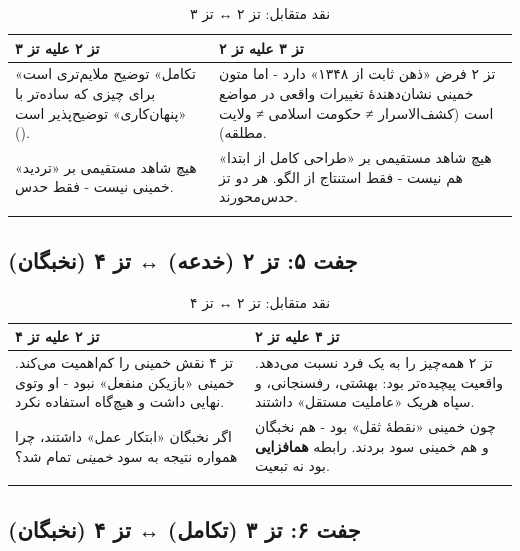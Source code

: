 \documentclass[12pt,a4paper]{book}
\newcommand{\keyword}[1]{\textbf{\textcolor{cPrimary}{#1}}}
\newcommand{\en}[1]{\lr{\textit{#1}}}
\begin{document}
\begin{longtable}{%
    >{\raggedleft\arraybackslash}p{}
    >{\raggedleft\arraybackslash}p{}}
\toprule
\rowcolor{cAccent!8}
\textbf{تز ۲ علیه تز ۳} &
\rowcolor{cGold!10}
\textbf{تز ۳ علیه تز ۲} \\
\midrule

«تکامل» توضیح ملایم‌تری است برای چیزی که ساده‌تر با «پنهان‌کاری» توضیح‌پذیر است (\en{Occam's Razor}). &
تز ۲ فرض «ذهن ثابت از ۱۳۴۸» دارد - اما متون خمینی نشان‌دهندهٔ تغییرات واقعی در مواضع است (کشف‌الاسرار ≠ حکومت اسلامی ≠ ولایت مطلقه). \\
\midrule

هیچ شاهد مستقیمی بر «تردید» خمینی نیست - فقط حدس. &
هیچ شاهد مستقیمی بر «طراحی کامل از ابتدا» هم نیست - فقط استنتاج از الگو. هر دو تز حدس‌محورند. \\

\bottomrule
\caption{نقد متقابل: تز ۲ ↔ تز ۳}
\end{longtable}

\subsection{جفت ۵: تز ۲ (خدعه) ↔ تز ۴ (نخبگان)}

\begin{longtable}{%
    >{\raggedleft\arraybackslash}p{}
    >{\raggedleft\arraybackslash}p{}}
\toprule
\rowcolor{cAccent!8}
\textbf{تز ۲ علیه تز ۴} &
\rowcolor{cConsolid!8}
\textbf{تز ۴ علیه تز ۲} \\
\midrule

تز ۴ نقش خمینی را کم‌اهمیت می‌کند. خمینی «بازیکن منفعل» نبود - او وتوی نهایی داشت و هیچ‌گاه استفاده نکرد. &
تز ۲ همه‌چیز را به یک فرد نسبت می‌دهد. واقعیت پیچیده‌تر بود: بهشتی، رفسنجانی، و سپاه هر‌یک «عاملیت مستقل» داشتند. \\
\midrule

اگر نخبگان «ابتکار عمل» داشتند، چرا همواره نتیجه به سود \textit{خمینی} تمام شد؟ &
چون خمینی «نقطهٔ ثقل» بود - هم نخبگان و هم خمینی سود بردند. رابطه \keyword{همافزایی} بود نه تبعیت. \\

\bottomrule
\caption{نقد متقابل: تز ۲ ↔ تز ۴}
\end{longtable}

\subsection{جفت ۶: تز ۳ (تکامل) ↔ تز ۴ (نخبگان)}
\end{document}
